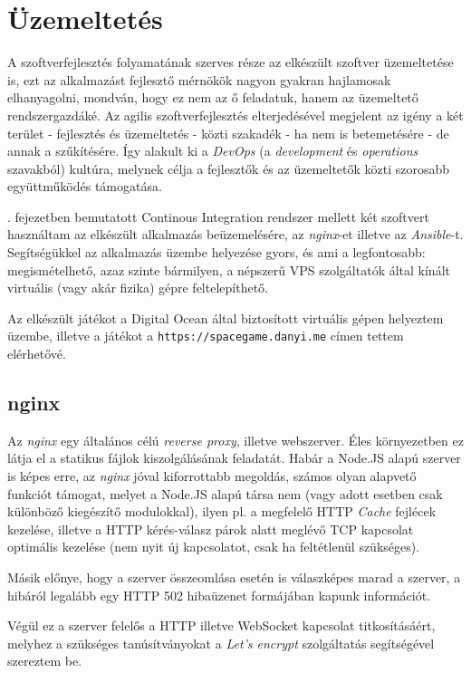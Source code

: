 \section{Üzemeltetés}

A szoftverfejlesztés folyamatának szerves része az elkészült szoftver
üzemeltetése is, ezt az alkalmazást fejlesztő mérnökök nagyon gyakran
hajlamosak elhanyagolni, mondván, hogy ez nem az ő feladatuk, hanem az
üzemeltető rendszergazdáké.  Az agilis szoftverfejlesztés elterjedésével
megjelent az igény a két terület - fejlesztés és üzemeltetés - közti szakadék -
ha nem is betemetésére - de annak a szűkítésére.  Így alakult ki a
\emph{DevOps} (a \emph{development} és \emph{operations} szavakból) kultúra,
melynek célja a fejlesztők és az üzemeltetők közti szorosabb együttműködés
támogatása.

. fejezetben bemutatott Continous Integration rendszer mellett két
szoftvert használtam az elkészült alkalmazás beüzemelésére, az \emph{nginx}-et
illetve az \emph{Ansible}-t. Segítségükkel az alkalmazás üzembe helyezése gyors,
és ami a legfontosabb: megismételhető, azaz szinte bármilyen, a népszerű VPS
szolgáltatók által kínált virtuális (vagy akár fizika) gépre feltelepíthető.

Az elkészült játékot a Digital Ocean által biztosított virtuális gépen helyeztem
üzembe, illetve a játékot a \texttt{https://spacegame.danyi.me} címen tettem
elérhetővé.

\subsection{nginx}\label{sec:nginx}

Az \emph{nginx}\cite{nginx} egy általános célú \emph{reverse proxy}, illetve
webszerver.  Éles környezetben ez látja el a statikus fájlok kiszolgálásának
feladatát. Habár a Node.JS alapú szerver is képes erre, az \emph{nginx} jóval
kiforrottabb megoldás, számos olyan alapvető funkciót támogat, melyet a Node.JS
alapú társa nem (vagy adott esetben csak különböző kiegészítő modulokkal), ilyen
pl. a megfelelő HTTP \emph{Cache} fejlécek kezelése, illetve a HTTP kérés-válasz
párok alatt meglévő TCP kapcsolat optimális kezelése (nem nyit új kapcsolatot,
csak ha feltétlenül szükséges).

Másik előnye, hogy a szerver összeomlása esetén is válaszképes marad a szerver,
a hibáról legalább egy HTTP 502 hibaüzenet formájában kapunk információt.

Végül ez a szerver felelős a HTTP illetve WebSocket kapcsolat titkosításáért,
melyhez a szükséges tanúsítványokat a \emph{Let's encrypt}\cite{letsencrypt}
szolgáltatás segítségével szereztem be.

